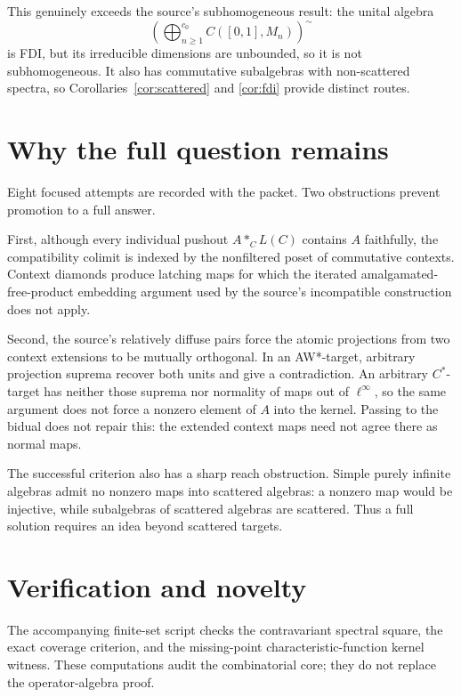 \documentclass[11pt]{article}
\begin{document}
This genuinely exceeds the source's subhomogeneous result: the unital algebra
\[
 \left(\bigoplus_{n\ge1}^{c_0} C([0,1],M_n)\right)^{\!\sim}
\]
is FDI, but its irreducible dimensions are unbounded, so it is not
subhomogeneous.  It also has commutative subalgebras with non-scattered spectra,
so Corollaries~\ref{cor:scattered} and \ref{cor:fdi} provide distinct routes.

\section{Why the full question remains}

Eight focused attempts are recorded with the packet.  Two obstructions prevent
promotion to a full answer.

First, although every individual pushout $A*_C L(C)$ contains $A$ faithfully,
the compatibility colimit is indexed by the nonfiltered poset of commutative
contexts.  Context diamonds produce latching maps for which the iterated
amalgamated-free-product embedding argument used by the source's incompatible
construction does not apply.

Second, the source's relatively diffuse pairs force the atomic projections from
two context extensions to be mutually orthogonal.  In an AW*-target, arbitrary
projection suprema recover both units and give a contradiction.  An arbitrary
$C^*$-target has neither those suprema nor normality of maps out of
$\ell^\infty$, so the same argument does not force a nonzero element of $A$ into
the kernel.  Passing to the bidual does not repair this: the extended context
maps need not agree there as normal maps.

The successful criterion also has a sharp reach obstruction.  Simple purely
infinite algebras admit no nonzero maps into scattered algebras: a nonzero map
would be injective, while subalgebras of scattered algebras are scattered.
Thus a full solution requires an idea beyond scattered targets.

\section{Verification and novelty}

The accompanying finite-set script checks the contravariant spectral square,
the exact coverage criterion, and the missing-point characteristic-function
kernel witness.  These computations audit the combinatorial core; they do not
replace the operator-algebra proof.
\end{document}
